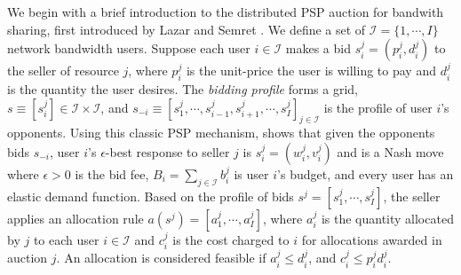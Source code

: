 \documentclass[12pt]{article}
\theoremstyle{definition}
\newcommand{\mcI}{\mathcal{I}}
\begin{document}
\begin{multicols}{2}
We begin with a brief introduction to the distributed PSP auction for bandwith
sharing, first introduced by Lazar and Semret \cite{lazar}.
We define a set of $\mcI = \lbrace 1,\cdots,I\rbrace$ network bandwidth users.
Suppose each user $i \in \mcI$ makes a bid $s_i^j = (p_i^j, d_i^j)$ to the
seller of resource $j$, where $p_i^j$ is the unit-price the user is willing to
pay and $d_i^j$ is the quantity the user desires. The \emph{bidding profile} forms a grid, $s \equiv
[s_i^j] \in \mcI \times \mcI$, and $s_{-i} \equiv [s_1^j , \cdots , s_{i-1}^j , s_{i+1}^j , \cdots
, s_I^j]_{j\in\mcI}$ is the profile of user $i$'s opponents. 
Using this classic PSP mechanism, \cite{lazar} shows that given the opponents
bids $s_{-i}$,
user $i$'s $\epsilon$-best response to seller $j$ is $s_i^j = (w_i^j, v_i^j)$
and is a Nash move
where $\epsilon > 0$ is the bid fee, $B_i =\sum_{j\in\mcI} b_i^j$ is user $i$'s
budget, and every user has an elastic demand function.
Based on the profile of bids $s^j = [s^j_1, \cdots , s^j_I]$, the seller applies
an allocation rule $a(s^j) = [a_1^j, \cdots , a_I^j]$, where $a^j_i$ is the quantity allocated
by $j$ to each user $i\in\mcI$ and $c^j_i$ is the cost charged to $i$ for
allocations awarded in auction $j$. 
An allocation is considered feasible if $a^j_i \le d_i^j$, and $c^j_i \le  p^j_i d_i^j$.


\end{multicols}
\end{document}

